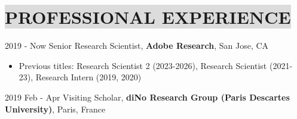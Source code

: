 \section*{
    \colorbox{gainsboro}{PROFESSIONAL EXPERIENCE}
}

2019 - Now \hspace{15mm} 
Senior Research Scientist, \textbf{Adobe Research},  San Jose, CA
\vspace{-1mm}
\begin{itemize}[noitemsep,itemsep=0pt,topsep=0pt,leftmargin=38mm]
    \item Previous titles: Research Scientist 2 (2023-2026), Research Scientist (2021-23), Research Intern (2019, 2020)
\end{itemize}




2019 Feb - Apr \hspace{10mm} 
Visiting Scholar, \textbf{diNo Research Group (Paris Descartes University)}, Paris, France

